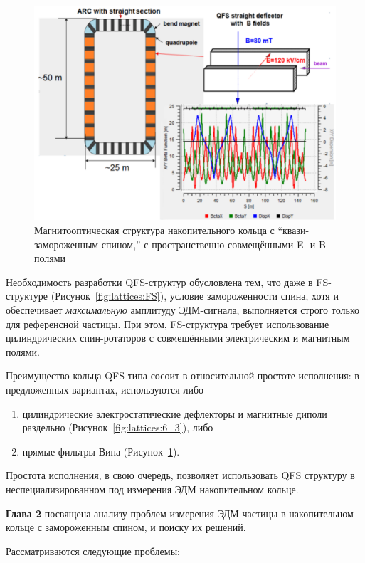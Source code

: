 \begin{figure}[H]\centering
	\includegraphics[width=.95\linewidth]{images/chapter2/E+B_lattice}
\caption{Магнитооптическая структура накопительного кольца с ``квази-замороженным спином,'' 
	с пространственно-совмещёнными E- и B-полями\label{fig:lattices:E+B}}
\end{figure}

Необходимость разработки QFS-структур обусловлена тем, 
что даже в FS-структуре (Рисунок~\ref{fig:lattices:FS}), условие замороженности спина, 
хотя и обеспечивает \emph{максимальную} амплитуду ЭДМ-сигнала, 
выполняется строго только для референсной частицы. 
При этом, FS-структура требует использование цилиндрических спин-ротаторов 
с совмещёнными электрическим и магнитным полями. 

Преимущество кольца QFS-типа сосоит в относительной простоте исполнения: 
в предложенных вариантах, используются либо
\begin{enumerate}
	\item цилиндрические электростатические дефлекторы и магнитные диполи раздельно
	 (Рисунок~\ref{fig:lattices:6_3}), либо
	\item прямые фильтры Вина (Рисунок~\ref{fig:lattices:E+B}).	
\end{enumerate}
Простота исполнения, в свою очередь, позволяет использовать QFS структуру в неспециализированном под
измерения ЭДМ накопительном кольце.

\textbf{Глава 2} посвящена анализу проблем измерения ЭДМ частицы 
в накопительном кольце с замороженным спином, и поиску их решений. 

Рассматриваются следующие проблемы:


